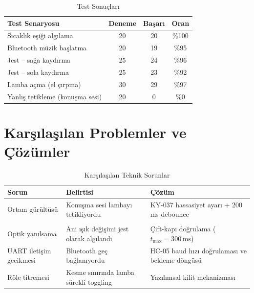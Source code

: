 \documentclass[12pt, a4paper]{article}
\begin{document}
\begin{table}[H]
  \centering
  \caption{Test Sonuçları}
  \begin{tabular}{lccc}
    \toprule
    \textbf{Test Senaryosu}          & \textbf{Deneme} & \textbf{Başarı} & \textbf{Oran} \\
    \midrule
    Sıcaklık eşiği algılama          & 20              & 20              & \%100 \\
    Bluetooth müzik başlatma          & 20              & 19              & \%95  \\
    Jest -- sağa kaydırma            & 25              & 24              & \%96  \\
    Jest -- sola kaydırma            & 25              & 23              & \%92  \\
    Lamba açma (el çırpma)           & 30              & 29              & \%97  \\
    Yanlış tetikleme (konuşma sesi)  & 20              & 0               & \%0   \\
    \bottomrule
  \end{tabular}
\end{table}

\section{Karşılaşılan Problemler ve Çözümler}

\begin{table}[H]
  \centering
  \caption{Karşılaşılan Teknik Sorunlar}
  \begin{tabular}{p{4cm}p{5.5cm}p{4cm}}
    \toprule
    \textbf{Sorun}           & \textbf{Belirtisi}                          & \textbf{Çözüm} \\
    \midrule
    Ortam gürültüsü & Konuşma sesi lambayı tetikliyordu & KY-037 hassasiyet ayarı + 200\,ms debounce \\\\
    Optik yanılsama          & Ani ışık değişimi jest olarak algılandı     & Çift-kapı doğrulama ($t_{\max}=300\,\mathrm{ms}$) \\
    UART iletişim gecikmesi  & Bluetooth geç bağlanıyordu                  & HC-05 baud hızı doğrulaması ve bekleme döngüsü \\
    Röle titremesi           & Kesme sınırında lamba sürekli toggling      & Yazılımsal kilit mekanizması \\
    \bottomrule
  \end{tabular}
\end{table}
\end{document}
